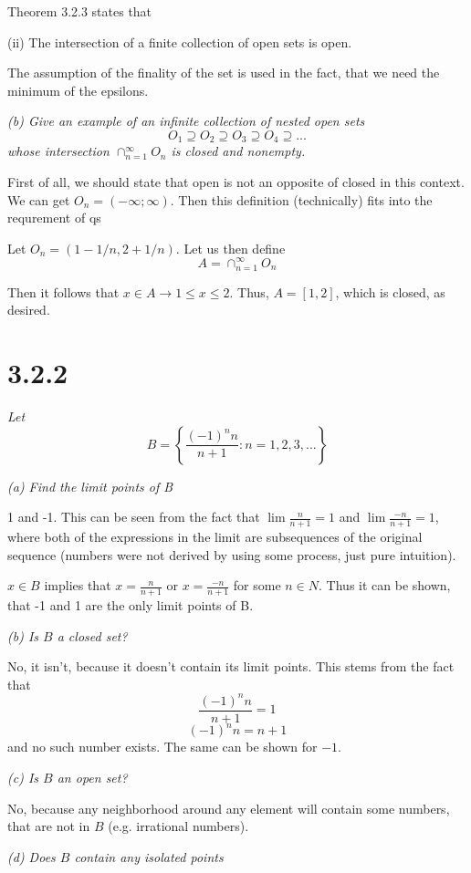 \documentclass[11pt,oneside,titlepage]{article}
\begin{document}
Theorem 3.2.3 states that

(ii) The intersection of a finite collection of open sets is open.

The assumption of the finality of the set is used in the fact, that we need
the minimum of the epsilons.

\textit{(b) Give an example of an infinite collection of nested open sets}
$$ O_1 \supseteq O_2 \supseteq O_3 \supseteq O_4 \supseteq ... $$
\textit{whose intersection $\cap_{n = 1}^{\infty} O_n$ is closed and nonempty.}

First of all, we should state that open is not an opposite of closed in this
context. We can get $O_n = (-\infty; \infty)$. Then this definition
(technically) fits into the requrement of qs

Let $O_n = (1 - 1/n, 2 + 1/n)$. Let us then define 
$$A = \cap_{n = 1}^{\infty} O_n$$

Then it follows that $x \in A \to 1 \leq x \leq 2$. Thus, $A = [1,2]$, which is
closed, as desired.


\section*{3.2.2 }
\textit{Let }
$$B = \left\{\frac{(-1)^nn}{n + 1}: n = 1,2,3,... \right\}$$

\textit{(a) Find the limit points of B}

1 and -1. This can be seen from the fact that $\lim \frac{n}{n + 1} = 1$ and
$\lim \frac{-n}{n + 1} = 1$, where both of the expressions in the limit
are subsequences of the original sequence (numbers were not derived by using
some process, just pure intuition).

$x \in B$ implies that $x = \frac{n}{n + 1}$  or $x = \frac{-n}{n + 1}$ for
some $n \in N$. Thus it can be shown, that -1 and 1 are the only limit points
of B.

\textit{(b) Is $B$ a closed set?}

No, it isn't, because it doesn't contain its limit points. This stems from
the fact that
$$\frac{(-1)^nn}{n + 1} = 1$$
$$(-1)^nn = n + 1$$
and no such number exists. The same can be shown for $-1$.

\textit{(c) Is $B$ an open set?}

No, because any neighborhood around any element will contain some  numbers,
that are not in $B$ (e.g. irrational numbers).

\textit{(d) Does $B$ contain any isolated points}
\end{document}
